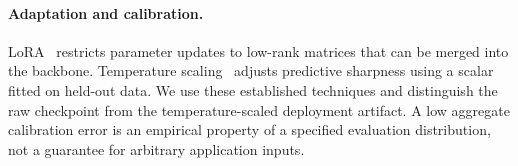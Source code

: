 \paragraph{Adaptation and calibration.}
LoRA~\citep{hu2021lora} restricts parameter updates to low-rank matrices that can be merged into the backbone. Temperature scaling~\citep{guo2017calibration} adjusts predictive sharpness using a scalar fitted on held-out data. We use these established techniques and distinguish the raw checkpoint from the temperature-scaled deployment artifact. A low aggregate calibration error is an empirical property of a specified evaluation distribution, not a guarantee for arbitrary application inputs.
